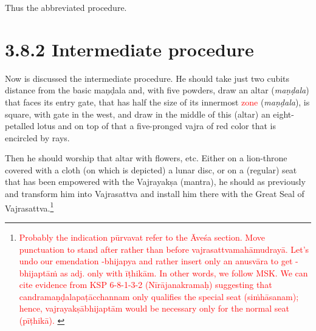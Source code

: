 \documentclass[11pt]{book}
\newcommand{\red}[1]{\textcolor{red}{#1}}
\begin{document}
Thus the abbreviated procedure.

\section{3.8.2 Intermediate procedure}

Now is discussed the intermediate procedure. He should take just two cubits distance from the basic maṇḍala and, with five powders, draw an altar (\textit{maṇḍala}) that faces its entry gate, that has half the size of its innermost \red{zone}  (\textit{maṇḍala}), is square, with gate in the west, and draw in the middle of this (altar) an eight-petalled lotus and on top of that a five-pronged vajra of red color that is encircled by rays.

Then he should worship that altar with flowers, etc. Either on a lion-throne covered with a cloth (on which is depicted) a lunar disc, or on a (regular) seat that has been empowered with the Vajrayakṣa (mantra), he should as previously and transform him into Vajrasattva and install him there with the Great Seal of Vajrasattva.\footnote{\red{
Probably the indication pūrvavat refer to the Āveśa section.
Move punctuation to stand after rather than before vajrasattvamahāmudrayā.
Let's undo our emendation -bhijapya and rather insert only an anusvāra to get -bhijaptāṁ as adj. only with īṭhikām. In other words, we follow MSK. We can cite evidence from KSP 6-8-1-3-2 (Nīrājanakramaḥ) suggesting that candramaṇḍalapaṭācchannam only qualifies the special seat (siṁhāsanam); hence, vajrayakṣābhijaptām would be necessary only for the normal seat (pīṭhikā). 
}} 

\end{document}
